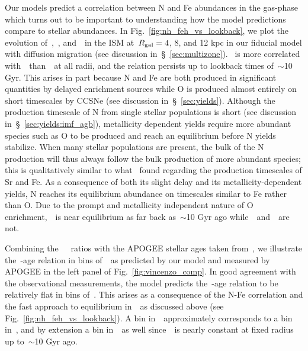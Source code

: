 \documentclass[ms.tex]{subfiles}
\begin{document}
Our models predict a correlation between N and Fe abundances in
the gas-phase which turns out to be important to understanding how the model
predictions compare to stellar abundances.
In Fig.~\ref{fig:nh_feh_vs_lookback}, we plot the evolution of~\nh,~\oh,
and~\feh~in the ISM at~$R_\text{gal} = 4$, 8, and 12 kpc in our fiducial model
with diffusion migration (see discussion in~\S~\ref{sec:multizone}).
\nh~is more correlated with~\feh~than~\oh~at all radii, and the relation
persists up to lookback times of~$\sim$10 Gyr.
This arises in part because N and Fe are both produced in significant
quantities by delayed enrichment sources while O is produced almost entirely on
short timescales by CCSNe (see discussion in~\S~\ref{sec:yields}).
Although the production timescale of N from single stellar populations is
short (see discussion in~\S~\ref{sec:yields:imf_agb}), metallicity dependent
yields require more abundant species such as O to be produced and reach an
equilibrium before N yields stabilize.
When many stellar populations are present, the bulk of the N production will
thus always follow the bulk production of more abundant species; this is 
qualitatively similar to what~\citet{Johnson2020} found regarding the
production timescales of Sr and Fe.
As a consequence of both its slight delay and its metallicity-dependent
yields, N reaches its equilibrium abundance on timescales similar to Fe rather
than O.
Due to the prompt and metallicity independent nature of O enrichment,~\oh~is
near equilibrium as far back as~$\sim$10 Gyr ago while~\nh~and~\feh~are not.
\par
Combining the~\citet{Vincenzo2021}~\no~ratios with the APOGEE stellar ages
taken from~\citet{Miglio2021}, we illustrate the~\no-age relation in bins
of~\feh~as predicted by our model and measured by APOGEE in the left panel of
Fig.~\ref{fig:vincenzo_comp}.
In good agreement with the observational measurements, the model predicts
the~\no-age relation to be relatively flat in bins of~\feh.
This arises as a consequence of the N-Fe correlation and the fast approach to
equilibrium in~\oh~as discussed above (see Fig.~\ref{fig:nh_feh_vs_lookback}).
A bin in~\feh~approximately corresponds to a bin in~\nh, and by extension a bin
in~\no~as well since~\oh~is nearly constant at fixed radius up to~$\sim$10 Gyr
ago.
\end{document}
